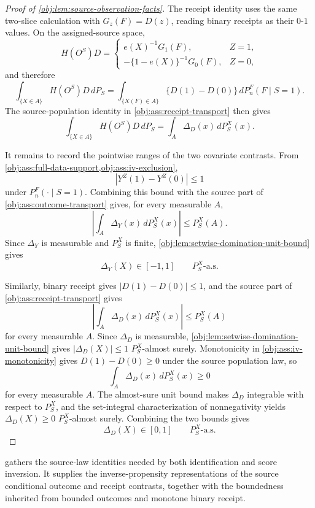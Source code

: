 \documentclass[11pt]{article}
\begin{document}
\begin{proof}[Proof of \cref{obj:lem:source-observation-facts}]
The receipt identity uses the same two-slice calculation with \(G_z(F)=D(z)\), reading binary
receipts as their \(0\)-\(1\) values.  On the assigned-source space,
\[
H(O^S)D
=
\begin{cases}
e(X)^{-1}G_1(F), & Z=1,\\
-\{1-e(X)\}^{-1}G_0(F), & Z=0,
\end{cases}
\]
and therefore
\[
\int_{\{X\in A\}} H(O^S)D\,dP_S
=
\int_{\{X(F)\in A\}}\{D(1)-D(0)\}\,dP_n^F(F\mid S=1).
\]
The source-population identity in \cref{obj:ass:receipt-transport} then gives
\[
\int_{\{X\in A\}} H(O^S)D\,dP_S
=
\int_A\Delta_D(x)\,dP_S^X(x).
\]

It remains to record the pointwise ranges of the two covariate contrasts.  From
\cref{obj:ass:full-data-support,obj:ass:iv-exclusion},
\[
\left|Y^Z(1)-Y^Z(0)\right|\le1
\]
under \(P_n^F(\cdot\mid S=1)\).  Combining this bound with the source part of
\cref{obj:ass:outcome-transport} gives, for every measurable \(A\),
\[
\left|\int_A\Delta_Y(x)\,dP_S^X(x)\right|
\le
P_S^X(A).
\]
Since \(\Delta_Y\) is measurable and \(P_S^X\) is finite, \cref{obj:lem:setwise-domination-unit-bound}
gives
\[
\Delta_Y(X)\in[-1,1]
\qquad P_S^X\text{-a.s.}
\]

Similarly, binary receipt gives \(|D(1)-D(0)|\le1\), and the source part of
\cref{obj:ass:receipt-transport} gives
\[
\left|\int_A\Delta_D(x)\,dP_S^X(x)\right|
\le
P_S^X(A)
\]
for every measurable \(A\).  Since \(\Delta_D\) is measurable, \cref{obj:lem:setwise-domination-unit-bound}
gives \(|\Delta_D(X)|\le1\) \(P_S^X\)-almost surely.  Monotonicity in
\cref{obj:ass:iv-monotonicity} gives \(D(1)-D(0)\ge0\) under the source population law, so
\[
\int_A\Delta_D(x)\,dP_S^X(x)\ge0
\]
for every measurable \(A\).  The almost-sure unit bound makes \(\Delta_D\) integrable with respect
to \(P_S^X\), and the set-integral characterization of nonnegativity yields
\(\Delta_D(X)\ge0\) \(P_S^X\)-almost surely.  Combining the two bounds gives
\[
\Delta_D(X)\in[0,1]
\qquad P_S^X\text{-a.s.}
\]
\end{proof}

 gathers the source-law identities needed by both identification and score inversion. It supplies the inverse-propensity representations of the source conditional outcome and receipt contrasts, together with the boundedness inherited from bounded outcomes and monotone binary receipt.
\end{document}
